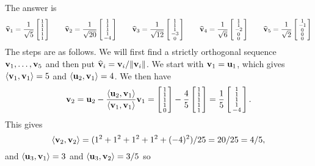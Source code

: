  The  answer is
 \[
  \hv_1 = \frac{1}{\sqrt{5}}\bsm 1\\ 1\\ 1\\ 1\\ 1\esm \hspace{2em}
  \hv_2 = \frac{1}{\sqrt{20}}\bsm 1\\ 1\\ 1\\ 1\\ -4\esm \hspace{2em}
  \hv_3 = \frac{1}{\sqrt{12}}\bsm 1\\ 1\\ 1\\ -3 \\ 0\esm \hspace{2em}
  \hv_4 = \frac{1}{\sqrt{6}}\bsm 1\\ 1\\ -2 \\ 0 \\ 0 \esm \hspace{2em}
  \hv_5 = \frac{1}{\sqrt{2}}\bsm 1\\ -1\\ 0\\ 0\\ 0\esm
 \]
 The steps are as follows.  We will first find a strictly
 orthogonal sequence $\vv_1,\dotsc,\vv_5$ and then put
 $\hv_i=\vv_i/\|\vv_i\|$.  We start with $\vv_1=\vu_1$, which gives
 $\ip{\vv_1,\vv_1}=5$ and $\ip{\vu_2,\vv_1}=4$.  We then have
 \[ \vv_2 = \vu_2 - \frac{\ip{\vu_2,\vv_1}}{\ip{\vv_1,\vv_1}}\vv_1 =
     \bsm 1\\1\\1\\1\\0 \esm -
     \frac{4}{5}\bsm 1\\1\\1\\1\\1 \esm =
     \frac{1}{5} \bsm 1\\1\\1\\1\\-4 \esm.
 \]
 This gives
 \[ \ip{\vv_2,\vv_2}=(1^2+1^2+1^2+1^2+(-4)^2)/25 = 20/25 = 4/5,
 \]
 and $\ip{\vu_3,\vv_1}=3$ and $\ip{\vu_3,\vv_2}=3/5$ so
